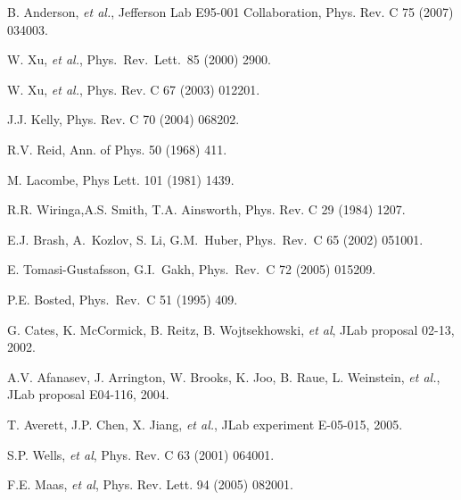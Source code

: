 \begin{thebibliography}{PPV06}
  B. Anderson, {\it et al.}, Jefferson Lab E95-001 Collaboration,
  Phys. Rev. C 75 (2007) 034003.

W. Xu, {\it et al.},
Phys.\ Rev.\ Lett.\  85 (2000) 2900.

W. Xu, {\it et al.}, Phys. Rev. C 67 (2003) 012201.

J.J. Kelly, Phys. Rev. C 70 (2004) 068202.

R.V. Reid, Ann. of Phys. 50 (1968) 411.

M. Lacombe, Phys Lett. 101 (1981) 1439.


R.R. Wiringa,A.S. Smith, T.A. Ainsworth, 
Phys. Rev. C 29 (1984) 1207.


E.J. Brash, A.~Kozlov, S. Li, G.M.~Huber,
Phys.\ Rev.\ C 65 (2002) 051001.

E. Tomasi-Gustafsson, G.I.~Gakh,
  Phys.\ Rev.\ C 72 (2005) 015209. 

  P.E. Bosted,
  Phys.\ Rev.\ C 51 (1995) 409.

G. Cates, K. McCormick, B. Reitz, B. Wojtsekhowski, {\it et al},
JLab proposal 02-13, 2002.

A.V. Afanasev, J. Arrington, W. Brooks, K. Joo, B. Raue, L. Weinstein, {\it et al.}, JLab proposal E04-116, 2004.

T. Averett, J.P. Chen, X. Jiang, {\it et al.}, JLab experiment E-05-015, 2005.

 S.P. Wells, {\it et al}, Phys. Rev. C 63 (2001) 064001.

 F.E. Maas, {\it et al}, Phys. Rev. Lett. 94 (2005) 082001. 


\end{thebibliography}

